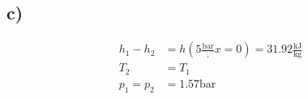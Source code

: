 

\subsection*{c)}

\begin{align*}
    h_1 - h_2 &= h \left( 5 \frac{\text{bar}}, x=0 \right) = 31.92 \frac{\text{kJ}}{\text{kg}} \\
    T_2 &= T_1 \\
    p_1 = p_2 &= 1.57 \text{bar}
\end{align*}